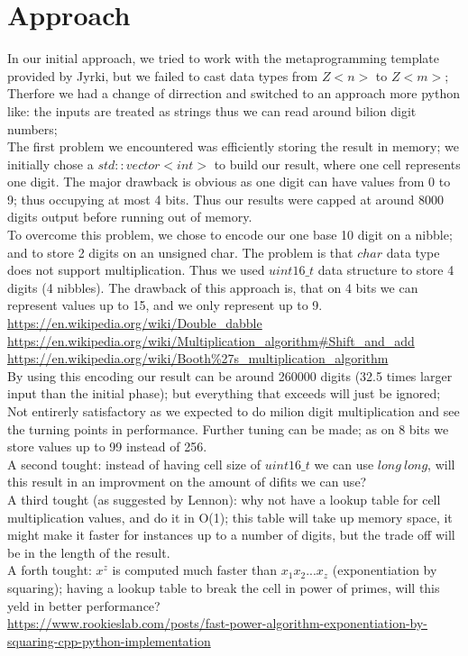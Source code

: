 \documentclass{DIKU-report}
\begin{document}
\section*{Approach}
In our initial approach, we tried to work with the metaprogramming template provided by Jyrki, but we failed to cast data types from $Z<n>$ to $Z<m>$;\\
Therfore we had a change of dirrection and switched to an approach more python like: the inputs are treated as strings thus we can read around bilion digit numbers;\\
The first problem we encountered was efficiently storing the result in memory; we initially chose a $std::vector<int>$ to build our result, where one cell represents one digit. The major drawback is obvious as one digit can have values from 0 to 9; thus occupying at most 4 bits. Thus our results were capped at around 8000 digits output before running out of memory.\\
To overcome this problem, we chose to encode our one base 10 digit on a nibble; and to store 2 digits on an unsigned char. The problem is that $char$ data type does not support multiplication. Thus we used $uint16\_t$ data structure to store 4 digits (4 nibbles). The drawback of this approach is, that on 4 bits we can represent values up to 15, and we only represent up to 9.\\
\url{https://en.wikipedia.org/wiki/Double_dabble}\\
\url{https://en.wikipedia.org/wiki/Multiplication_algorithm#Shift_and_add}\\
\url{https://en.wikipedia.org/wiki/Booth%27s_multiplication_algorithm}\\
By using this encoding our result can be around 260000 digits (32.5 times larger input than the initial phase); but everything that exceeds will just be ignored; Not entirerly satisfactory as we expected to do milion digit multiplication and see the turning points in performance. Further tuning can be made; as on 8 bits we store values up to 99 instead of 256.\\
A second tought: instead of having cell size of $uint16\_t$ we can use $long\ long$, will this result in an improvment on the amount of difits we can use?\\
A third tought (as suggested by Lennon): why not have a lookup table for cell multiplication values, and do it in O(1); this table will take up memory space, it might make it faster for instances up to a number of digits, but the trade off will be in the length of the result.\\
A forth tought: $x^{z}$ is computed much faster than $x_1x_2...x_z$ (exponentiation by squaring); having a lookup table to break the cell in power of primes, will this yeld in better performance? \\
\url{https://www.rookieslab.com/posts/fast-power-algorithm-exponentiation-by-squaring-cpp-python-implementation}
\end{document}

